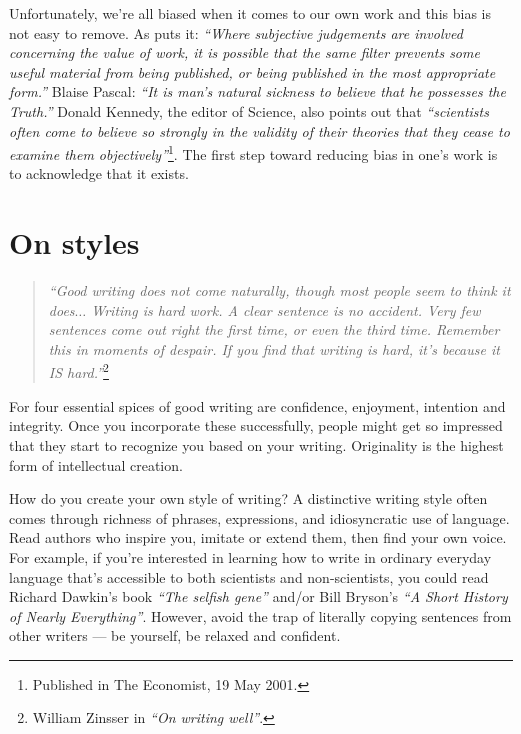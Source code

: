 \documentclass[graybox,envcountchap,sectrefs,UStrade]{svmono}
\begin{document}
Unfortunately, we're all biased when it comes to our own work and this bias is not easy to remove. As \citet{Creedy2008research} puts it: \emph{``Where subjective judgements are involved concerning the value of work, it is possible that the same filter prevents some useful material from being published, or being published in the most appropriate form.''} Blaise Pascal: \emph{``It is man's natural sickness to believe that he possesses the Truth.''} Donald Kennedy, the editor of Science, also points out that \emph{``scientists often come to believe so strongly in the validity of their theories that they cease to examine them objectively''}\footnote{Published in The Economist, 19 May 2001.}. The first step toward reducing bias in one's work is to acknowledge that it exists.\par


\section{On styles}

\begin{quote}
\emph{``Good writing does not come naturally, though most people seem to think it does$\ldots$ Writing is hard work. A clear sentence is no accident. Very few sentences come out right the first time, or even the third time. Remember this in moments of despair. If you find that writing is hard, it's because it IS hard.''}\footnote{William Zinsser in \emph{``On writing well''}.}
\end{quote}

For \citet{Zinsser2006} four essential spices of good writing are confidence, enjoyment, intention and integrity. Once you incorporate these successfully, people might get so impressed that they start to recognize you based on your writing. Originality is the highest form of intellectual creation. \par

How do you create your own style of writing? A distinctive writing style often comes through richness of phrases, expressions, and idiosyncratic use of language. Read authors who inspire you, imitate or extend them, then find your own voice. For example, if you're interested in learning how to write in ordinary everyday language that's accessible to both scientists and non-scientists, you could read Richard Dawkin's book \emph{``The selfish gene''} and/or Bill Bryson's \emph{``A Short History of Nearly Everything''}. However, avoid the trap of literally copying sentences from other writers --- be yourself, be relaxed and confident. \par
\end{document}
